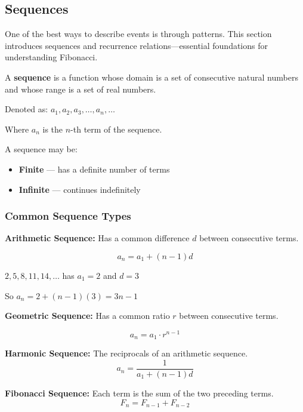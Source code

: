 \documentclass[11pt,a4paper]{article}
\begin{document}
\subsection{Sequences}

One of the best ways to describe events is through patterns. This section introduces sequences and recurrence relations---essential foundations for understanding Fibonacci.

\begin{definitionbox}[Sequence]
A \textbf{sequence} is a function whose domain is a set of consecutive natural numbers and whose range is a set of real numbers.

Denoted as: $a_1, a_2, a_3, \ldots, a_n, \ldots$

Where $a_n$ is the $n$-th term of the sequence.

A sequence may be:
\begin{itemize}[noitemsep]
    \item \textbf{Finite} — has a definite number of terms
    \item \textbf{Infinite} — continues indefinitely
\end{itemize}
\end{definitionbox}

\subsubsection{Common Sequence Types}

\textbf{Arithmetic Sequence:} Has a common difference $d$ between consecutive terms.
\begin{formulabox}
$$a_n = a_1 + (n - 1)d$$
\end{formulabox}

\begin{examplebox}[Example]
$2, 5, 8, 11, 14, \ldots$ has $a_1 = 2$ and $d = 3$

So $a_n = 2 + (n-1)(3) = 3n - 1$
\end{examplebox}

\textbf{Geometric Sequence:} Has a common ratio $r$ between consecutive terms.
\begin{formulabox}
$$a_n = a_1 \cdot r^{n-1}$$
\end{formulabox}

\textbf{Harmonic Sequence:} The reciprocals of an arithmetic sequence.
$$a_n = \frac{1}{a_1 + (n-1)d}$$

\textbf{Fibonacci Sequence:} Each term is the sum of the two preceding terms.
$$F_n = F_{n-1} + F_{n-2}$$
\end{document}
